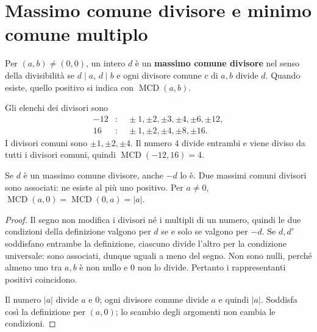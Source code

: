 \begin{schema}
\end{schema}

\section{Massimo comune divisore e minimo comune multiplo}
\begin{definizione}
Per $(a,b)\ne(0,0)$, un intero $d$ è un \textbf{massimo comune divisore} nel senso della divisibilità se $d\mid a$, $d\mid b$ e ogni divisore comune $c$ di $a,b$ divide $d$. Quando esiste, quello positivo si indica con $\operatorname{MCD}(a,b)$.
\end{definizione}

\begin{esempio}
Gli elenchi dei divisori sono
\[
\begin{aligned}
-12&:\quad \pm1,\pm2,\pm3,\pm4,\pm6,\pm12,\\
16&:\quad \pm1,\pm2,\pm4,\pm8,\pm16.
\end{aligned}
\]
I divisori comuni sono $\pm1,\pm2,\pm4$. Il numero $4$ divide entrambi e viene diviso da tutti i divisori comuni, quindi $\operatorname{MCD}(-12,16)=4$.
\end{esempio}

\begin{proposizione}
Se $d$ è un massimo comune divisore, anche $-d$ lo è. Due massimi comuni divisori sono associati: ne esiste al più uno positivo. Per $a\ne0$, $\operatorname{MCD}(a,0)=\operatorname{MCD}(0,a)=|a|$.
\end{proposizione}

\begin{proof}
Il segno non modifica i divisori né i multipli di un numero, quindi le due condizioni della definizione valgono per $d$ se e solo se valgono per $-d$. Se $d,d'$ soddisfano entrambe la definizione, ciascuno divide l'altro per la condizione universale: sono associati, dunque uguali a meno del segno. Non sono nulli, perché almeno uno tra $a,b$ è non nullo e $0$ non lo divide. Pertanto i rappresentanti positivi coincidono.

Il numero $|a|$ divide $a$ e $0$; ogni divisore comune divide $a$ e quindi $|a|$. Soddisfa così la definizione per $(a,0)$; lo scambio degli argomenti non cambia le condizioni.
\end{proof}

